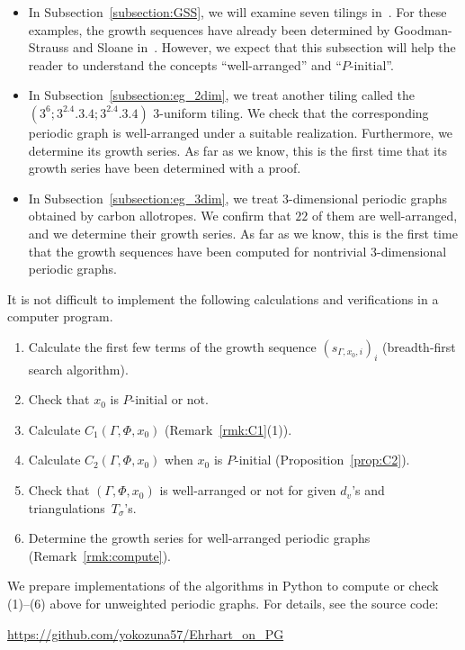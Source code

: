 \documentclass[ALCO,published]{cedram}
\theoremstyle{remark}
\begin{document}
\begin{itemize}
\item
In Subsection~\ref{subsection:GSS}, we will examine seven tilings in~\cite{GS19}. 
For these examples, the growth sequences have already been determined by Goodman-Strauss and Sloane in~\cite{GS19}. 
However, we expect that this subsection will help the reader to understand the concepts ``well-arranged'' and ``$P$-initial''.


\item
In Subsection~\ref{subsection:eg_2dim}, we treat another tiling called the $(3^6;3^2.4.3.4;3^2.4.3.4)$ 3-uniform tiling. 
We check that the corresponding periodic graph is well-arranged under a suitable realization. 
Furthermore, we determine its growth series. 
As far as we know, this is the first time that its growth series have been determined with a proof. 


\item
In Subsection~\ref{subsection:eg_3dim}, we treat $3$-dimensional periodic graphs obtained by carbon allotropes. 
We confirm that $22$ of them are well-arranged, and we determine their growth series. 
As far as we know, this is the first time that the growth sequences have been computed for nontrivial $3$-dimensional periodic graphs. 
\end{itemize}


\begin{rmk}\label{rmk:impl}
It is not difficult to implement the following calculations and verifications in a computer program. 
\begin{enumerate}
\item 
Calculate the first few terms of the growth sequence $(s_{\Gamma, x_0, i})_i$ 
 (breadth-first search algorithm).
 
\item 
Check that $x_0$ is $P$-initial or not. 

\item
Calculate $C_1(\Gamma, \Phi, x_0)$ (Remark~\ref{rmk:C1}(1)). 

\item
Calculate $C_2(\Gamma, \Phi, x_0)$ when $x_0$ is $P$-initial (Proposition~\ref{prop:C2}).
 
\item
Check that $(\Gamma, \Phi, x_0)$ is well-arranged or not for given $d_v$'s and triangulations~$T_{\sigma}$'s. 

\item
Determine the growth series for well-arranged periodic graphs (Remark~\ref{rmk:compute}). 
\end{enumerate}

We prepare implementations of the algorithms in {\sf Python} to compute or check (1)--(6) above for unweighted periodic graphs. 
For details, see the source code:
\begin{center}
\url{https://github.com/yokozuna57/Ehrhart_on_PG}
\end{center}
\end{rmk}
\end{document}
